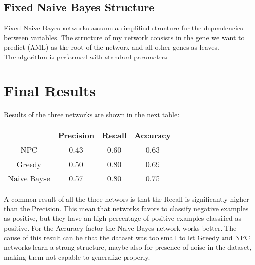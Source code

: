 \documentclass{article}
\begin{document}
\subsection{Fixed Naive Bayes Structure}
Fixed Naive Bayes networks assume a simplified structure for the dependencies between variables. The structure of my network consists in the gene we want to predict (AML) as the root of the network and all other genes as leaves.\\
The algorithm is performed with standard parameters.

\section{Final Results}
Results of the three networks are shown in the next table:
\begin{center}
\begin{tabular}{c|ccc}
            & Precision & Recall & Accuracy \\ \hline
NPC         & 0.43      & 0.60   & 0.63     \\
Greedy      & 0.50      & 0.80   & 0.69     \\
Naive Bayse & 0.57      & 0.80   & 0.75    
\end{tabular}
\end{center}

A common result of all the three networs is that the Recall is significantly higher than the Precision. This mean that networks favors to classify negative examples as positive, but they have an high percentage of positive examples classified as positive.
For the Accuracy factor the Naive Bayes network works better. The cause of this result can be that the dataset was too small to let Greedy and NPC networks learn a strong structure, maybe also for presence of noise in the dataset, making them not capable to generalize properly.
\end{document}
